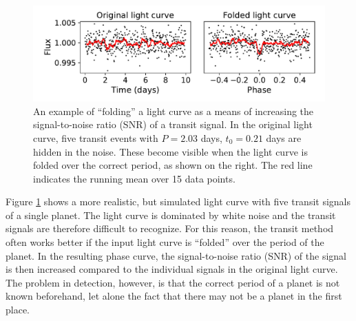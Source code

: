 \begin{figure}
    \centering
    \includegraphics[width=0.6\linewidth]{Background/Figures/folding.pdf}
    \caption{An example of ``folding'' a light curve as a means of increasing the signal-to-noise ratio (SNR) of a transit signal. In the original light curve, five transit events with $P= 2.03$ days, $t_0= 0.21$ days are hidden in the noise. These become visible when the light curve is folded over the correct period, as shown on the right. The red line indicates the running mean over 15 data points.}
    \label{fig:folding}
\end{figure}

Figure \ref{fig:folding} shows a more realistic, but simulated light curve with five transit signals of a single planet. The light curve is dominated by white noise and the transit signals are therefore difficult to recognize. For this reason, the transit method often works better if the input light curve is ``folded'' over the period of the planet. In the resulting phase curve, the signal-to-noise ratio (SNR) of the signal is then increased compared to the individual signals in the original light curve. The problem in detection, however, is that the correct period of a planet is not known beforehand, let alone the fact that there may not be a planet in the first place.
